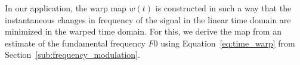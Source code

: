 In our application, the warp map $w(t)$ is constructed in such a way that the instantaneous changes in frequency of the signal in the linear time domain are minimized in the warped time domain. For this, we derive the map from an estimate of the fundamental frequency $F0$ using Equation~\ref{eq:time_warp} from Section~\ref{sub:frequency_modulation}.



